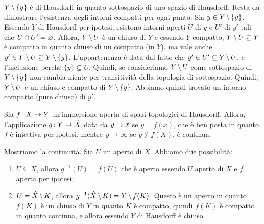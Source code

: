\documentclass[a4paper]{article}
\begin{document}
\begin{snippetproof}{}
    \(Y \,\backslash\, \{y\}\) è di Hausdorff in quanto sottospazio di uno spazio di Hausdorff.
    Resta da dimostrare l'esistenza degli intorni compatti per ogni punto.
    Sia \(y\in Y \,\backslash\, \{y\}\).
    Essendo \(Y\) di Hausdorff per ipotesi, esistono
    intorni aperti \(U\) di \(y\) e \(U'\) di \(y'\)
    tali che \(U \cap U' = \varnothing\).
    Allora, \(Y \,\backslash\, U\) è un chiuso di \(Y\) e essendo \(Y\) compatto,
    \(Y \,\backslash\, U \subseteq Y\) è compatto in quanto chiuso di un compatto (in \(Y\)),
    ma vale anche \(y' \in Y \,\backslash\, U \subseteq Y \,\backslash\, \{y\}\).
    L'appartenenza è data dal fatto che \(y' \in U' \subseteq Y \,\backslash\, U\),
    e l'inclusione perché \(\{y\} \subseteq U\).
    Quindi, se consideriamo \(Y \,\backslash\, U\) come sottospazio di \(Y \,\backslash\, \{y\}\)
    non cambia niente per transitività della topologia di sottospazio.
    Quindi, \(Y \,\backslash\, U\) è un chiuso e compatto di \(Y \,\backslash\, \{y\}\).
    Abbiamo quindi trovato un intorno compatto (pure chiuso) di \(y'\).
\end{snippetproof}

\begin{snippetproposition}{}
    Sia \(f \colon X \to Y\) un'immersione
    aperta di spazi topologici di Hausdorff.
    Allora, l'applicazione \(g\colon Y \to \hat{X}\)
    data da \(y \to x\) se \(y = f(x)\),
    che è ben posta in quanto \(f\) è iniettiva per ipotesi,
    mentre \(y \to \infty\) se \(y \notin f(X)\),
    è continua.
\end{snippetproposition}

\begin{snippetproof}{}
    Mostriamo la continuità.
    Sia \(U\) un aperto di \(\hat{X}\). Abbiamo due possibilità:
    \begin{enumerate}
        \item \(U \subseteq X\), allora \(g^{-1}(U) = f(U)\) che è aperto essendo
        \(U\) aperto di \(X\) e \(f\) aperta per ipotesi;
        \item \(U = \hat{X} \,\backslash\, K\), allora \(g^{-1}(\hat{X} \,\backslash\, K) = Y \,\backslash\, f(K)\).
        Questo è un aperto in quanto \(f(K)\) è un chiuso di \(Y\)
        in quanto \(K\) è compatto, quindi \(f(K)\) è compatto in quanto continua,
        e allora essendo \(Y\) di Hausdorff è chiuso.
    \end{enumerate}
\end{snippetproof}
\end{document}
